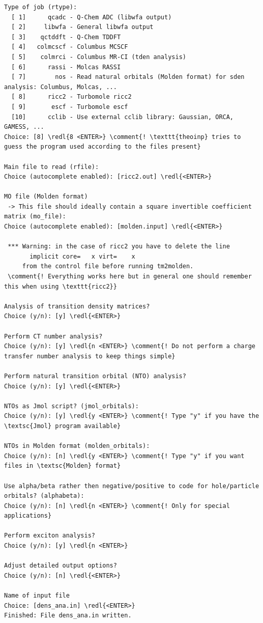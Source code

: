 \documentclass[DIV=12,headings=normal]{scrartcl}
\newcommand{\comment}[1]{\textcolor{blue}{#1}}
\newcommand{\redl}[1]{{\textcolor{red}{\underline{#1}}}}
\newcounter{number}
\begin{document}
\scriptsize
\begin{Verbatim}[commandchars=\\\{\}]
Type of job (rtype):
  [ 1]      qcadc - Q-Chem ADC (libwfa output)
  [ 2]     libwfa - General libwfa output
  [ 3]    qctddft - Q-Chem TDDFT
  [ 4]   colmcscf - Columbus MCSCF
  [ 5]    colmrci - Columbus MR-CI (tden analysis)
  [ 6]      rassi - Molcas RASSI
  [ 7]        nos - Read natural orbitals (Molden format) for sden analysis: Columbus, Molcas, ...
  [ 8]      ricc2 - Turbomole ricc2
  [ 9]       escf - Turbomole escf
  [10]      cclib - Use external cclib library: Gaussian, ORCA, GAMESS, ...
Choice: [8] \redl{8 <ENTER>} \comment{! \texttt{theoinp} tries to guess the program used according to the files present}

Main file to read (rfile):
Choice (autocomplete enabled): [ricc2.out] \redl{<ENTER>}

MO file (Molden format)
 -> This file should ideally contain a square invertible coefficient matrix (mo_file):
Choice (autocomplete enabled): [molden.input] \redl{<ENTER>}

 *** Warning: in the case of ricc2 you have to delete the line
       implicit core=   x virt=    x
     from the control file before running tm2molden.
 \comment{! Everything works here but in general one should remember this when using \texttt{ricc2}}

Analysis of transition density matrices?
Choice (y/n): [y] \redl{<ENTER>}

Perform CT number analysis?
Choice (y/n): [y] \redl{n <ENTER>} \comment{! Do not perform a charge transfer number analysis to keep things simple}

Perform natural transition orbital (NTO) analysis?
Choice (y/n): [y] \redl{<ENTER>}

NTOs as Jmol script? (jmol_orbitals):
Choice (y/n): [y] \redl{y <ENTER>} \comment{! Type "y" if you have the \textsc{Jmol} program available}

NTOs in Molden format (molden_orbitals):
Choice (y/n): [n] \redl{y <ENTER>} \comment{! Type "y" if you want files in \textsc{Molden} format}

Use alpha/beta rather then negative/positive to code for hole/particle orbitals? (alphabeta):
Choice (y/n): [n] \redl{n <ENTER>} \comment{! Only for special applications}

Perform exciton analysis?
Choice (y/n): [y] \redl{n <ENTER>}

Adjust detailed output options?
Choice (y/n): [n] \redl{<ENTER>}

Name of input file
Choice: [dens_ana.in] \redl{<ENTER>}
Finished: File dens_ana.in written.
\end{Verbatim}
\normalsize
\end{document}
